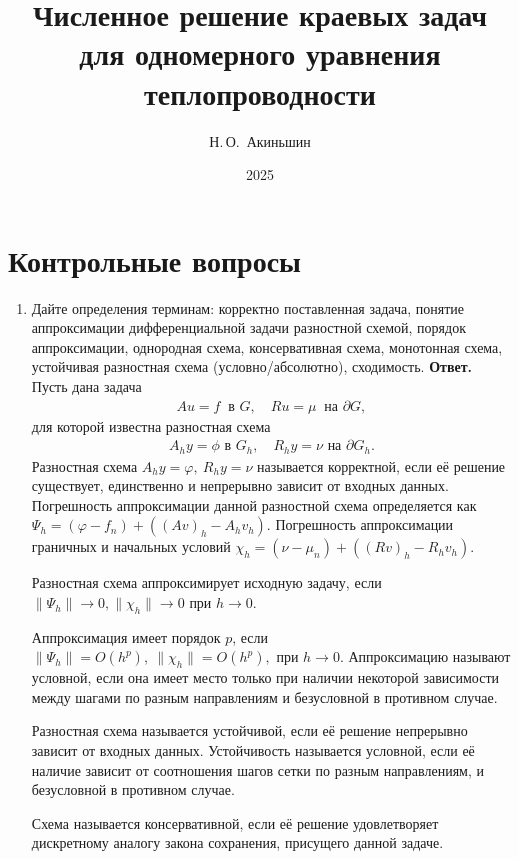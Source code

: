 \documentclass{article}
\title{Численное решение краевых задач для одномерного уравнения теплопроводности}
\author{Н.\,О.~Акиньшин}
\date{2025}
\begin{document}
    \maketitle
    \newpage
    \tableofcontents
    \newpage

    \section{Контрольные вопросы}
	\begin{enumerate}
		\item Дайте определения терминам: корректно поставленная задача, понятие аппроксимации дифференциальной задачи
		разностной схемой, порядок аппроксимации, однородная
		схема, консервативная схема, монотонная схема, устойчивая разностная схема (условно/абсолютно), сходимость.
		\newline
		{\bfseries Ответ. } 
		Пусть дана задача 
		\begin{align*}
			Au = f \  \text{ в } G, \quad  Ru = \mu \  \text{ на } \partial G,
		\end{align*}
		для которой известна разностная схема 
		\begin{align*}
			A_h y = \phi \text{ в } G_h, \quad R_h y = \nu \text{ на }\partial G_h.
		\end{align*}
		Разностная схема $A_h y = \varphi, \ R_h y = \nu$ называется корректной, если её решение существует,
		единственно и непрерывно зависит от входных данных.
		Погрешность аппроксимации данной разностной схема определяется как $\Psi_h = (\varphi - f_n) + 
		((Av)_h - A_h v_h)$.
		Погрешность аппроксимации граничных и начальных условий $\chi_h = (\nu - \mu_n) + 
		((R v)_h - R_h v_h) $.

		Разностная схема аппроксимирует исходную задачу, если 
		$\|\Psi_h\| \to 0, \|\chi_h\| \to 0 \text{ при } {h \to 0}$.
		
		Аппроксимация имеет порядок $p$, если$\|\Psi_h \| = O(h^p),\  \|\chi_h\| = O(h^p), 
		\text{ при } h \to 0$.
		Аппроксимацию называют условной, если она имеет место только при наличии некоторой зависимости 
		между шагами по разным направлениям и безусловной в противном случае. 

		Разностная схема называется устойчивой, если её решение непрерывно зависит от входных данных. 
		Устойчивость называется условной, если её наличие зависит от соотношения шагов сетки по разным 
		направлениям, и безусловной в противном случае.

		Схема называется консервативной, если её решение удовлетворяет дискретному аналогу закона сохранения,
		 присущего данной задаче.


\end{enumerate}
\end{document}
